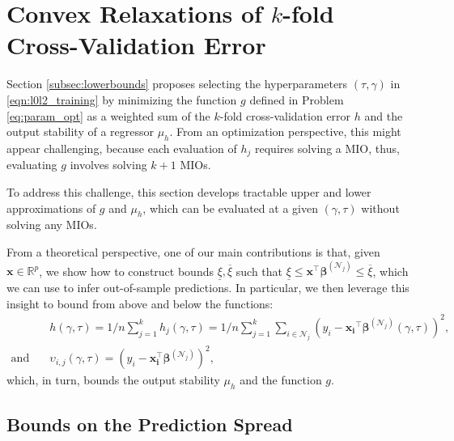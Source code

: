 \documentclass[mnsc,nonblindrev]{informs3} %
\begin{document}
\section{Convex Relaxations of $k$-fold Cross-Validation Error}\label{sec:lowerbounds}
{\color{black}Section \ref{subsec:lowerbounds} proposes selecting the hyperparameters $(\tau, \gamma)$ in  \eqref{eqn:l0l2_training} by minimizing the function $g$ defined in Problem \eqref{eq:param_opt} as a weighted sum of the $k$-fold cross-validation error $h$ and the output stability of a regressor $\mu_h$. From an optimization perspective, this might appear challenging, because {\color{black}each evaluation of $h_j$ requires solving a MIO, thus,}
evaluating $g$ involves solving $k+1$ MIOs. %

To address this challenge, this section develops tractable upper and lower approximations of $g$ and $\mu_h$, which can be evaluated at a given $(\gamma, \tau)$ without solving any MIOs.} From a theoretical perspective, one of our main contributions is that, given $\bm{x}\in \mathbb{R}^p$, we show how to construct bounds $\underline \xi,\overline\xi$ such that $\underline \xi\leq \bm{x^\top\beta}^{(\mathcal{N}_j)}\leq \overline \xi$, which we can use to infer out-of-sample predictions. In particular, we then leverage this insight to bound from above and below the functions:
\begin{align}
	&h(\gamma, \tau)=1/n \sum_{j=1}^k h_j(\gamma, \tau)=1/n\sum_{j=1}^k\sum_{i \in \mathcal{N}_j}\left(y_i -\bm{x_i}^\top \bm{\beta}^{(\mathcal{N}_j)}(\gamma,\tau)\right)^2,\label{eqn:crossValError}\\
    \text{and} \quad & \upsilon_{i,j}(\gamma,\tau)=(y_i-\bm{x_i^\top}\bm{\beta}^{(\mathcal{N}_j)})^2, \label{eqn:epsilondefn} 
\end{align} 
which, in turn, bounds the output stability $\mu_h$ and the function $g$.

\subsection{Bounds on the Prediction Spread}\label{sec:predictionBound}
\end{document}
